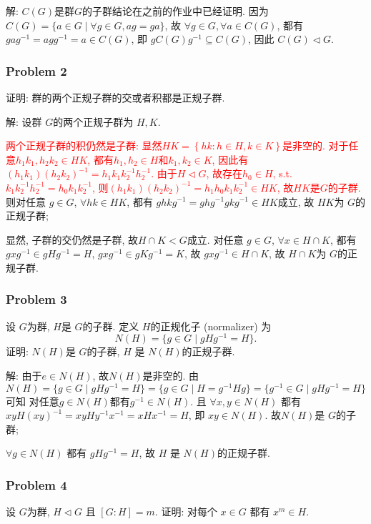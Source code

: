 \documentclass[a4paper,12pt]{ctexart}
\begin{document}
  解:  $C(G)$是群$G$的子群结论在之前的作业中已经证明. 
  因为 $ C(G)=\{a\in G\mid \forall g\in G,ag=ga\} $, 
  故 $ \forall g\in G,\forall a\in C(G) $, 都有 
  $ gag^{-1}=agg^{-1}=a\in C(G) $, 即 $ gC(G)g^{-1}\subseteq C(G) $, 因此 $ C(G)\triangleleft G $.

\subsubsection*{Problem 2} 
    证明: 群的两个正规子群的交或者积都是正规子群.
  
    解: 
    设群 $ G $的两个正规子群为 $ H,K $. 
    
    \textcolor{red}{两个正规子群的积仍然是子群: 显然$HK=\left\{ hk:h\in H,k\in K \right\}$是非空的. 对于任意$h_1k_1,h_2k_2\in HK$, 都有$h_1,h_2\in H$和$k_1,k_2\in K$, 因此有$(h_1k_1)(h_2k_2)^{-1}=h_1k_1k_{2}^{-1}h_2^{-1}$.
    由于$H\triangleleft G$, 故存在$h_0\in H$, s.t. $k_1k_2^{-1}h_2^{-1}=h_0k_1k_2^{-1}$, 则$(h_1k_1)(h_2k_2)^{-1}=h_1h_0k_1k_2^{-1}\in HK$, 故$HK$是$G$的子群.}
    则对任意 $ g\in G $, $ \forall hk\in HK $, 
    都有 $ ghkg^{-1}=ghg^{-1}gkg^{-1}\in HK $成立, 故 $ HK $为 $ G $的正规子群;

    显然, 子群的交仍然是子群, 故$H\cap K<G$成立. 
    对任意 $ g\in G $, $ \forall x\in H\cap K $, 都有 $ gxg^{-1}\in gHg^{-1}=H $, $ gxg^{-1}\in gKg^{-1}=K $, 故
    $ gxg^{-1}\in H\cap K $, 故 $ H\cap K $为 $ G $的正规子群.
  
\subsubsection*{Problem 3}
  设 $ G $为群, $ H $是 $ G $的子群. 定义 $ H $的正规化子 (normalizer) 为
  \[N(H)=\{g\in G\mid gHg^{-1}=H\}.\]
  证明: $ N(H) $是 $ G $的子群, $ H $ 是 $ N(H) $的正规子群.

  解: 由于$e\in N(H)$, 故$N(H)$是非空的. 由$ N(H)=\{g\in G\mid gHg^{-1}=H\}=\{g\in G\mid H=g^{-1}Hg\}=\{g^{-1}\in G\mid gHg^{-1}=H\}$可知 对任意$g\in N(H)$都有$g^{-1}\in N(H)$. 
  且 $ \forall x,y\in N(H) $ 都有 $ xyH(xy)^{-1}=xyHy^{-1}x^{-1}=xHx^{-1}=H $, 即 $ xy\in N(H) $. 故$ N(H) $是 $ G $的子群;

  $ \forall g\in N(H) $ 都有 $ gHg^{-1}=H $, 故 $ H $ 是 $ N(H) $的正规子群.
\subsubsection*{Problem 4}
  设 $ G $为群, $ H\triangleleft G $ 且 $ [G:H]=m $. 证明: 对每个 $ x\in G $ 都有 $ x^m\in H $.
\end{document}
